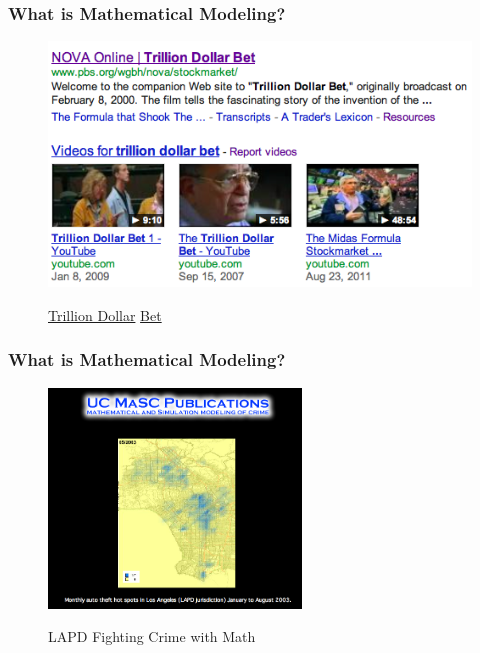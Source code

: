 \documentclass[hyperref={colorlinks=false},compress,handout,10pt]{beamer}
\begin{document}
\begin{frame}
    \frametitle{What is Mathematical Modeling?}
    \begin{figure}
        \centering
        \caption{
        \href{http://www.youtube.com/watch?v=Jzl39jqZjsw&feature=share&list=UUEWRMyobsgQG-PaC9ldME4A}{
        Trillion Dollar} 
        \href{http://www.youtube.com/watch?v=G17rx7H3DtI&feature=BFa&list=UUEWRMyobsgQG-PaC9ldME4A}{Bet}
        }
        \href{http://www.youtube.com/watch?v=dsrOXJwGwtk}{
        \includegraphics[width=\textwidth]{TrillionDollarBet.png}
        }
        \label{fig:LTCM}
    \end{figure}
\end{frame}

\begin{frame}
    \frametitle{What is Mathematical Modeling?}
    \begin{figure}
        \centering
        \caption{{LAPD Fighting Crime with Math}}
        \href{http://www.youtube.com/watch?v=HZ7fLuO7zb4}{\includegraphics[width=0.6\textwidth]{LAPDUCLA.png}}
        \label{fig:LAPDUCLA}
    \end{figure}
\end{frame}
\end{document}
